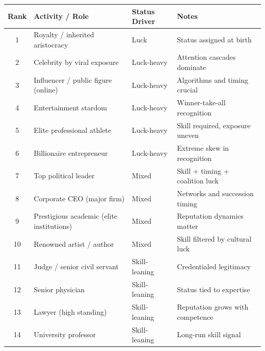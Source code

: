 \begin{table}[H]
  \centering
  \small
  \begin{tabular}{clll}
    \toprule \textbf{Rank} & \textbf{Activity / Role}                  & \textbf{Status Driver} & \textbf{Notes}                   \\
    \midrule 1             & Royalty / inherited aristocracy           & Luck                   & Status assigned at birth         \\
    2                      & Celebrity by viral exposure               & Luck-heavy             & Attention cascades dominate      \\
    3                      & Influencer / public figure (online)       & Luck-heavy             & Algorithms and timing crucial    \\
    4                      & Entertainment stardom                     & Luck-heavy             & Winner-take-all recognition      \\
    5                      & Elite professional athlete                & Luck-heavy             & Skill required, exposure uneven  \\
    6                      & Billionaire entrepreneur                  & Luck-heavy             & Extreme skew in recognition      \\
    7                      & Top political leader                      & Mixed                  & Skill + timing + coalition luck  \\
    8                      & Corporate CEO (major firm)                & Mixed                  & Networks and succession timing   \\
    9                      & Prestigious academic (elite institutions) & Mixed                  & Reputation dynamics matter       \\
    10                     & Renowned artist / author                  & Mixed                  & Skill filtered by cultural luck  \\
    11                     & Judge / senior civil servant              & Skill-leaning          & Credentialed legitimacy          \\
    12                     & Senior physician                          & Skill-leaning          & Status tied to expertise         \\
    13                     & Lawyer (high standing)                    & Skill-leaning          & Reputation grows with competence \\
    14                     & University professor                      & Skill-leaning          & Long-run skill signal            \\

\end{tabular}
\end{table}
